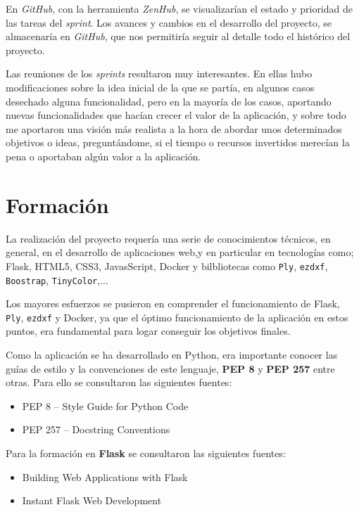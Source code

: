 En \emph{GitHub}, con la herramienta \emph{ZenHub}, se visualizarían el estado y prioridad de las tareas del \emph{sprint}. Los avances y cambios en el desarrollo del proyecto, se almacenaría en \emph{GitHub}, que nos permitiría seguir al detalle  todo el histórico del proyecto.

Las reuniones de los \emph{sprints} resultaron muy interesantes. En ellas hubo modificaciones sobre la idea inicial de la que se partía, en algunos casos desechado alguna funcionalidad, pero en la mayoría de los casos, aportando nuevas funcionalidades que hacían  crecer el valor de la aplicación, y sobre todo me aportaron una visión más realista a la hora de abordar unos determinados objetivos o ideas, preguntándome, si el tiempo o recursos invertidos merecían la pena o aportaban algún valor a la aplicación.

\section{Formación}

La realización del proyecto requería una serie de conocimientos técnicos, en general, en el desarrollo de aplicaciones web,y en particular en  tecnologías como;
Flask, HTML5, CSS3, JavasScript, Docker y bilbliotecas como \texttt{Ply}, \texttt{ezdxf}, \texttt{Boostrap}, \texttt{TinyColor},...

Los mayores esfuerzos se pusieron en comprender el funcionamiento de Flask, \texttt{Ply}, \texttt{ezdxf} y Docker, ya que el óptimo funcionamiento de la aplicación  en estos puntos, era fundamental para logar conseguir los objetivos finales. 

Como la aplicación se ha desarrollado en Python, era importante conocer las guías de estilo y la convenciones de este lenguaje, \textbf{PEP 8} y \textbf{PEP 257} entre otras. Para ello se consultaron las siguientes fuentes:

\begin{itemize}
\item PEP 8 -- Style Guide for Python Code \cite{PEP8}
\item PEP 257 -- Docstring Conventions \cite{PEP257}
\end{itemize}


Para la formación en \textbf{Flask} se consultaron las siguientes fuentes:

\begin{itemize}
\item Building Web Applications  with Flask \cite{Flask1}
\item Instant Flask Web Development \cite{Flask2}
\end{itemize}


